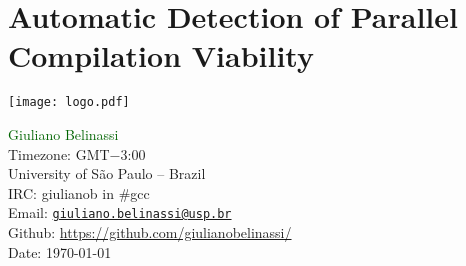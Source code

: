 


%
%
%
%
%
%
%
%
%
%

\chapter{Automatic Detection of Parallel Compilation Viability}
\vspace*{\fill}
{
     \centering
     \texttt{[image: logo.pdf]}
    \par
}
\vspace*{\fill}
\normalsize{
\noindent\textcolor{darkgreen}{Giuliano Belinassi} \\
Timezone: GMT$-$3:00 \\
University of São Paulo -- Brazil \\
IRC: giulianob in \#gcc \\
Email: \href{mailto:giuliano.belinassi@usp.br}{\texttt{giuliano.belinassi@usp.br}} \\
Github: \url{https://github.com/giulianobelinassi/} \\
Date: \today
}
\newpage

